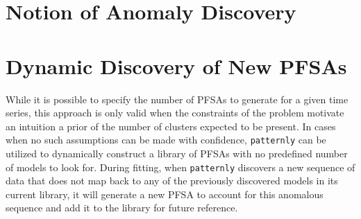 \documentclass[9pt,journal]{IEEEtran}
\begin{document}
{\section{Notion of Anomaly Discovery}

\section{Dynamic Discovery of New PFSAs}
While it is possible to specify the number of PFSAs to generate for a given time series, this approach is only valid when the constraints of the problem motivate an intuition a prior of the number of clusters expected to be present. In cases when no such assumptions can be made with confidence, \texttt{patternly} can be utilized to dynamically construct a library of PFSAs with no predefined number of models to look for. During fitting, when \texttt{patternly} discovers a new sequence of data that does not map back to any of the previously discovered models in its current library, it will generate a new PFSA to account for this anomalous sequence and add it to the library for future reference.
   

}



              



\end{document}
